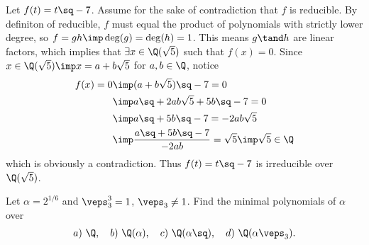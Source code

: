 \documentclass{article}
\begin{document}
\begin{solution}
Let \( f(t) = t\sq - 7 \).
Assume for the sake of contradiction that \( f \) is reducible.
By definiton of reducible, \( f \) must equal the product of polynomials with strictly lower degree, so \( f=gh \imp \deg(g) = \deg(h) = 1 \).
This means \( g\tand h \) are linear factors, which implies that \( \exists x\in \Q(\sqrt 5) \) such that \( f(x) = 0 \).
Since \( x\in \Q(\sqrt 5) \imp x=a+b\sqrt 5 \) for \( a,b\in \Q \), notice \begin{align*}
  f(x) = 0 &\imp (a+b\sqrt{5})\sq - 7 = 0 \\
  &\imp a\sq + 2ab\sqrt 5 + 5b\sq - 7 = 0 \\
  &\imp a\sq + 5b\sq - 7 = - 2ab\sqrt 5 \\
  &\imp \frac{a\sq + 5b\sq - 7}{-2ab} = \sqrt 5 \imp \sqrt 5\in \Q
\end{align*}
which is obviously a contradiction.
Thus \( f(t) = t\sq - 7 \) is irreducible over \( \Q(\sqrt 5) \).
\end{solution}

\begin{subexercise}
Let \( \alpha=2^{1/6} \) and \( \veps_3^3=1 \), \( \veps_3\neq 1 \). Find the minimal polynomials of \( \alpha \) over \begin{align*}
  a)\ \Q, \quad b)\ \Q(\alpha), \quad c)\ \Q(\alpha\sq), \quad d)\ \Q(\alpha\veps_3).
\end{align*}
\end{subexercise}
\end{document}
